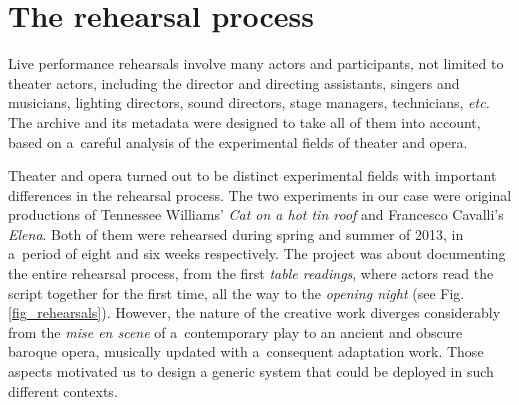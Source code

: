 \documentclass[conference]{IEEEtran}
\newcommand{\todo}[1]{\noindent\textcolor{red}{{\bf \{ToDo} #1{\bf \}}}}
\begin{document}


\section{The rehearsal process}
\label{sec:context}
%

Live performance rehearsals involve many actors and participants, not limited to theater actors,  including the director and  directing assistants, singers and musicians, lighting directors, sound directors, stage managers, technicians, \emph{etc.} The archive and its metadata were designed to take all of them into account, based on a~careful analysis of the experimental fields of  theater and opera.



Theater and opera turned out to be distinct experimental fields with important differences in the rehearsal process.  The two experiments in our case were original productions of  Tennessee Williams' \emph{Cat on a hot tin roof} and Francesco Cavalli's \emph{Elena}. Both of them  were rehearsed during spring and summer of 2013, in a~period of eight and six weeks respectively. The project was about documenting the entire rehearsal process, from the first \emph{table readings}, where actors read the script together for the first time, all the way to the \emph{opening night} (see Fig.\ref{fig_rehearsals}). However, the nature of the creative work diverges considerably from the \emph{mise en scene} of a~contemporary play to an ancient and obscure baroque opera, musically updated with a~consequent adaptation work. Those aspects motivated us to design  
a generic system that could be deployed in such different contexts.
\end{document}
